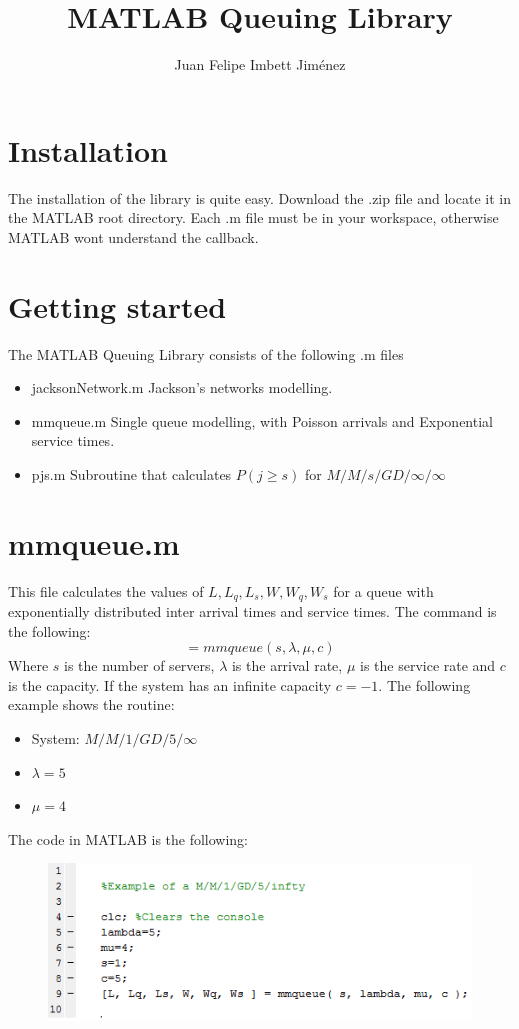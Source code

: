 \documentclass[•]{article}
\begin{document}
\title{MATLAB Queuing Library}
\author{Juan Felipe Imbett Jim\'enez}
\maketitle
\section{Installation}
The installation of the library is quite easy. Download the .zip file and locate it in the MATLAB root directory. Each .m file must be in your workspace, otherwise MATLAB wont understand the callback. 
\section{Getting started}
The MATLAB Queuing Library consists of the following .m files
\begin{itemize}
\item jacksonNetwork.m Jackson's networks modelling. 
\item mmqueue.m Single queue modelling, with Poisson arrivals and Exponential service times. 
\item pjs.m Subroutine that calculates $P(j \geq s)$ for $M/M/s/GD/\infty / \infty$
\end{itemize}
\section{mmqueue.m}
This file calculates the values of $L,L_q,L_s,W,W_q,W_s$ for a queue with exponentially distributed inter arrival times and service times. The command is the following: \bigskip
\begin{equation}
[L,L_q,L_s,W,W_q,W_s]=mmqueue(s, \lambda, \mu, c)
\end{equation}
Where $s$ is the number of servers, $\lambda$ is the arrival rate, $\mu$ is the service rate and $c$ is the capacity. If the system has an infinite capacity $c=-1$. The following example shows the routine:
\begin{itemize}
\item System: $M/M/1/GD/5 / \infty$
\item $\lambda=5$
\item $\mu=4$ 
\end{itemize}
\bigskip
 The code in MATLAB is the following:

 \begin{center}
 \begin{figure}
 \includegraphics[scale=0.8]{Example1.png}
 \end{figure}
 \end{center}
  
\end{document}
